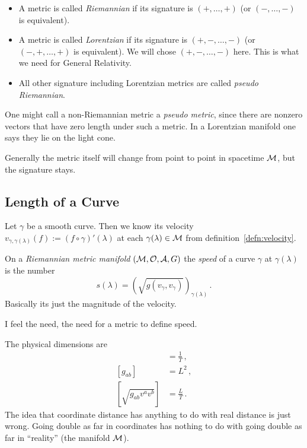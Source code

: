 \documentclass[11pt, a4paper, twocolumn]{article} %
\begin{document}
\begin{defn}
    \begin{itemize}
        \item A metric is called \textit{Riemannian} if its signature is
            $(+, \ldots, +)$ (or $(-, \ldots, -)$ is equivalent).
        \item A metric is called \textit{Lorentzian} if its signature is
            $(+,-, \ldots, -)$ (or $(-,+, \ldots, +)$ is equivalent).
            We will chose $(+,-, \ldots, -)$ here.
            This is what we need for General Relativity.
        \item All other signature including Lorentzian metrics are called
            \textit{pseudo Riemannian}.
    \end{itemize}
\end{defn}
\begin{note}
    One might call a non-Riemannian metric a \textit{pseudo metric}, since
    there are nonzero vectors that have zero length under such a metric.
    In a Lorentzian manifold one says they lie on the light cone.
\end{note}
\begin{note}
    Generally the metric itself will change from point to point in spacetime $\mathcal{M}$,
    but the signature stays.
\end{note}
\subsection{Length of a Curve}
Let $\gamma$ be a smooth curve.
Then we know its velocity $v_{\gamma,\gamma(\lambda)}(f) := (f \circ \gamma)'(\lambda)$
at each $\gamma(\lambda)\in \mathcal{M}$ from definition~\ref{defn:velocity}.

\begin{defn}
    On a \textit{Riemannian metric manifold} $(\mathcal{M}, \mathcal{O}, \mathcal{A}, G)$ the
    \textit{speed} of a curve $\gamma$ at $\gamma(\lambda)$ is the number
    \begin{equation}
        s(\lambda) = \left( \sqrt{g(v_\gamma, v_\gamma)} \right)_{\gamma(\lambda)}\,.
    \end{equation}
    Basically its just the magnitude of the velocity.
\end{defn}
\begin{note}
    I feel the need, the need for  a metric to define speed.
\end{note}
\begin{note}
    The physical dimensions are
    \begin{align*}
        [v^a] &= \frac{1}{T}\,,\\
        [g_{ab}] &= L^2\,,\\
        [\sqrt{g_{ab}v^av^b}] &= \frac{L}{T}\,.
    \end{align*}
    The idea that coordinate distance has anything to do with real distance is just wrong.
    Going double as far in coordinates has nothing to do with going double as far
    in ``reality'' (the manifold $\mathcal{M}$).
\end{note}
\end{document}
